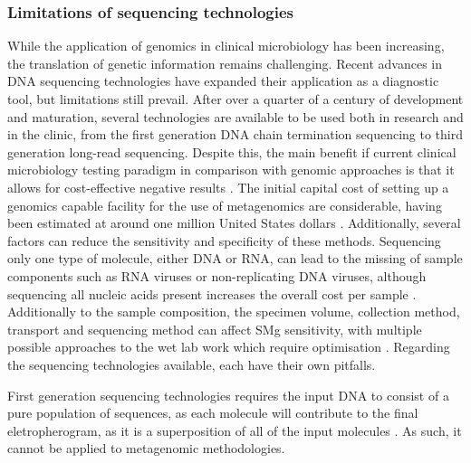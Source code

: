 \subsubsection{Limitations of sequencing technologies}

While the application of genomics in clinical microbiology has been increasing, the translation of genetic information remains challenging. Recent advances in DNA sequencing technologies have expanded their application as a diagnostic tool, but limitations still prevail. After over a quarter of a century of development and maturation, several technologies are available to be used both in research and in the clinic, from the first generation DNA chain termination sequencing to third generation long-read sequencing. Despite this, the main benefit if current clinical microbiology testing paradigm in comparison with genomic approaches is that it allows for cost-effective negative results \citep{greninger_challenge_2018}. The initial capital cost of setting up a genomics capable facility for the use of metagenomics are considerable, having been estimated at around one million United States dollars \citep{greninger_challenge_2018}. Additionally, several factors can reduce the sensitivity and specificity of these methods. Sequencing only one type of molecule, either \ac{DNA} or \ac{RNA}, can lead to the missing of sample components such as RNA viruses or non-replicating DNA viruses, although sequencing all nucleic acids present increases the overall cost per sample \citep{schuele_future_2021}. Additionally to the sample composition, the specimen volume, collection method, transport and sequencing method can affect \ac{SMg} sensitivity, with multiple possible approaches to the wet lab work which require optimisation \citep{petersen_third-generation_2019}. Regarding the sequencing technologies available, each have their own pitfalls. 

First generation sequencing technologies requires the input \ac{DNA} to consist of a pure population of sequences, as each molecule will contribute to the final eletropherogram, as it is a superposition of all of the input molecules \citep{hagemann_overview_2015}. As such, it cannot be applied to metagenomic methodologies.


